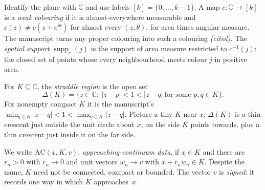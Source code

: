\documentclass[11pt]{article}
\theoremstyle{definition}
\theoremstyle{remark}
\begin{document}
Identify the plane with $\mathbb C$ and use labels $[k]=\{0,\dots,k-1\}$.
A map $c:\mathbb C\to[k]$ is a \emph{weak colouring} if it is
almost-everywhere measurable and $c(z)\ne c(z+e^{i\theta})$ for almost
every $(z,\theta)$, for area times angular measure. The manuscript turns
any proper colouring into such a colouring \emph{(cited)}.
The \emph{spatial support} $\operatorname{supp}_c(j)$ is the support of area
measure restricted to $c^{-1}(j)$: the closed set of points whose every
neighbourhood meets colour $j$ in positive area.

For $K\subseteq\mathbb C$, the \emph{straddle region} is the open set
\[
  \Delta(K)=\{z\in\mathbb C:\ |z-p|<1<|z-q|\ \text{for some }p,q\in K\}.
\]
For nonempty compact $K$ it is the manuscript's
$\min_{q\in K}|z-q|<1<\max_{q\in K}|z-q|$. Picture a tiny $K$ near $x$:
$\Delta(K)$ is a thin crescent just outside the unit circle about $x$, on
the side $K$ points towards, plus a thin crescent just inside it on the far
side.

We write $\mathrm{AC}(x,K,v)$, \emph{approaching-continuum data}, if
$x\in K$ and there are $r_n>0$ with $r_n\to0$ and unit vectors $w_n\to v$
with $x+r_nw_n\in K$. Despite the name, $K$ need not be connected, compact
or bounded. The vector $v$ is \emph{signed}: it records one way in which
$K$ approaches~$x$.
\end{document}
